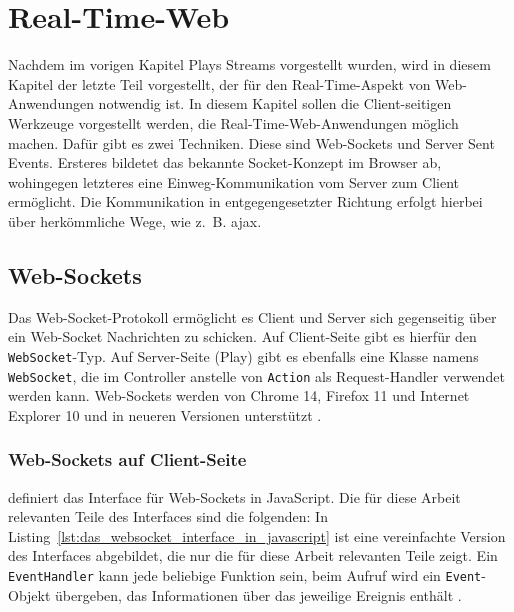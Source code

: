 
\chapter{Real-Time-Web} %
\label{cha:real_time_web}

Nachdem im vorigen Kapitel Plays Streams vorgestellt wurden, wird in diesem Kapitel der letzte Teil vorgestellt, der für den Real-Time-Aspekt von Web-Anwendungen notwendig ist.
In diesem Kapitel sollen die Client-seitigen Werkzeuge vorgestellt werden, die Real-Time-Web-Anwendungen möglich machen.
Dafür gibt es zwei Techniken.
Diese sind Web-Sockets und Server Sent Events.
Ersteres bildetet das bekannte Socket-Konzept im Browser ab, wohingegen letzteres eine Einweg-Kommunikation vom Server zum Client ermöglicht.
Die Kommunikation in entgegengesetzter Richtung erfolgt hierbei über herkömmliche Wege, wie z.~B. \gls{ajax}.

\section{Web-Sockets} %
\label{sec:web_sockets}

Das Web-Socket-Protokoll \cite[vgl.][]{websocket_protocol} ermöglicht es Client und Server sich gegenseitig über ein Web-Socket Nachrichten zu schicken.
Auf Client-Seite gibt es hierfür den \lstinline|WebSocket|-Typ.
Auf Server-Seite (Play) gibt es ebenfalls eine Klasse namens \lstinline|WebSocket|, die im Controller anstelle von \lstinline|Action| als Request-Handler verwendet werden kann.
Web-Sockets werden von Chrome 14, Firefox 11 und Internet Explorer 10 und in neueren Versionen unterstützt \cite[vgl.][]{js_websocket_compatibility}.

\subsection{Web-Sockets auf Client-Seite} %
\label{sub:web_sockets_auf_client_seite}

\citealt{js_websockets} definiert das Interface für Web-Sockets in JavaScript.
Die für diese Arbeit relevanten Teile des Interfaces sind die folgenden:
In Listing~\ref{lst:das_websocket_interface_in_javascript} ist eine vereinfachte Version des Interfaces abgebildet, die nur die für diese Arbeit relevanten Teile zeigt.
Ein \lstinline|EventHandler| kann jede beliebige Funktion sein, beim Aufruf wird ein \lstinline|Event|-Objekt übergeben, das Informationen über das jeweilige Ereignis enthält \cite[vgl.][]{js_eventhandler}.

